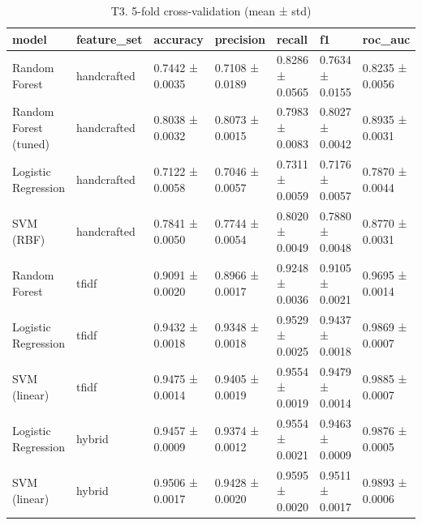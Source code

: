\begin{table}
\caption{T3. 5-fold cross-validation (mean ± std)}
\begin{tabular}{lllllll}
\toprule
model & feature_set & accuracy & precision & recall & f1 & roc_auc \\
\midrule
Random Forest & handcrafted & 0.7442 ± 0.0035 & 0.7108 ± 0.0189 & 0.8286 ± 0.0565 & 0.7634 ± 0.0155 & 0.8235 ± 0.0056 \\
Random Forest (tuned) & handcrafted & 0.8038 ± 0.0032 & 0.8073 ± 0.0015 & 0.7983 ± 0.0083 & 0.8027 ± 0.0042 & 0.8935 ± 0.0031 \\
Logistic Regression & handcrafted & 0.7122 ± 0.0058 & 0.7046 ± 0.0057 & 0.7311 ± 0.0059 & 0.7176 ± 0.0057 & 0.7870 ± 0.0044 \\
SVM (RBF) & handcrafted & 0.7841 ± 0.0050 & 0.7744 ± 0.0054 & 0.8020 ± 0.0049 & 0.7880 ± 0.0048 & 0.8770 ± 0.0031 \\
Random Forest & tfidf & 0.9091 ± 0.0020 & 0.8966 ± 0.0017 & 0.9248 ± 0.0036 & 0.9105 ± 0.0021 & 0.9695 ± 0.0014 \\
Logistic Regression & tfidf & 0.9432 ± 0.0018 & 0.9348 ± 0.0018 & 0.9529 ± 0.0025 & 0.9437 ± 0.0018 & 0.9869 ± 0.0007 \\
SVM (linear) & tfidf & 0.9475 ± 0.0014 & 0.9405 ± 0.0019 & 0.9554 ± 0.0019 & 0.9479 ± 0.0014 & 0.9885 ± 0.0007 \\
Logistic Regression & hybrid & 0.9457 ± 0.0009 & 0.9374 ± 0.0012 & 0.9554 ± 0.0021 & 0.9463 ± 0.0009 & 0.9876 ± 0.0005 \\
SVM (linear) & hybrid & 0.9506 ± 0.0017 & 0.9428 ± 0.0020 & 0.9595 ± 0.0020 & 0.9511 ± 0.0017 & 0.9893 ± 0.0006 \\
\bottomrule
\end{tabular}
\end{table}
